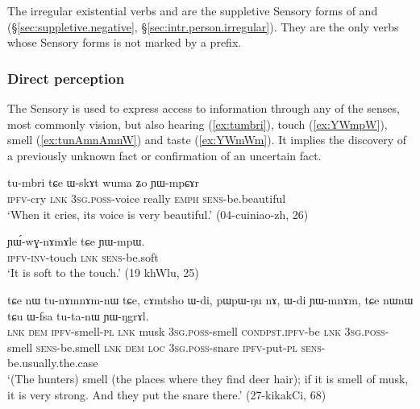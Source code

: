 The irregular existential verbs  and  are the suppletive Sensory forms of  and  (§\ref{sec:suppletive.negative}, §\ref{sec:intr.person.irregular}). They are the only verbs whose Sensory forms is not marked by a prefix. 



\subsubsection{Direct perception} \label{sec:sensory.evd}
The Sensory is used to express access to information \citep{tournadre14evidentiality} through any of the senses, most commonly vision, but also hearing (\ref{ex:tumbri}), touch (\ref{ex:YWmpW}), smell (\ref{ex:tunAmnAmnW}) and taste (\ref{ex:YWmWm}). It implies the discovery of a previously unknown fact or confirmation of an uncertain fact.

\begin{exe}
\ex \label{ex:tumbri}
\gll tu-mbri tɕe ɯ-skɤt wuma ʑo ɲɯ-mpɕɤr \\
\textsc{ipfv}-cry \textsc{lnk} \textsc{3sg}.\textsc{poss}-voice really \textsc{emph} \textsc{sens}-be.beautiful \\
\glt `When it cries, its voice is very beautiful.' (04-cuiniao-zh, 26)
\end{exe}

\begin{exe}
\ex \label{ex:YWmpW}
\gll ɲɯ́-wɣ-nɤmɤle tɕe ɲɯ-mpɯ. \\
\textsc{ipfv}-\textsc{inv}-touch \textsc{lnk} \textsc{sens}-be.soft \\
\glt `It is soft to the touch.' (19 khWlu, 25)
\end{exe}

\begin{exe}
\ex \label{ex:tunAmnAmnW}
\gll tɕe nɯ tu-nɤmnɤm-nɯ tɕe, cɤmtsho ɯ-di, pɯ\redp{}pɯ-ŋu nɤ, ɯ-di ɲɯ-mnɤm, tɕe nɯnɯ tɕu ɯ-fsa tu-ta-nɯ ɲɯ-ŋgrɤl. \\
\textsc{lnk} \textsc{dem} \textsc{ipfv}-smell-\textsc{pl} \textsc{lnk} musk \textsc{3sg}.\textsc{poss}-smell \textsc{cond\redp{}pst.ipfv}-be \textsc{lnk} \textsc{3sg}.\textsc{poss}-smell \textsc{sens}-be.smell \textsc{lnk} \textsc{dem} \textsc{loc} \textsc{3sg}.\textsc{poss}-snare \textsc{ipfv}-put-\textsc{pl} \textsc{sens}-be.usually.the.case \\
\glt `(The hunters) smell (the places where they find deer hair); if it is smell of musk, it is very strong. And they put the snare there.' (27-kikakCi, 68)
\end{exe}

